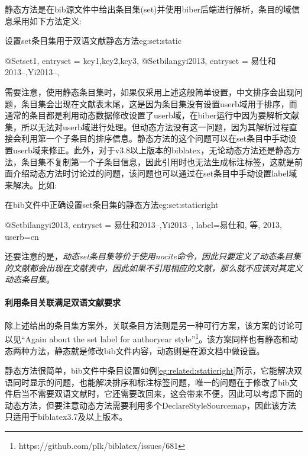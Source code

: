 静态方法是在bib源文件中给出条目集(set)并使用biber后端进行解析，条目的域信息采用如下方法定义:
\begin{example}{设置set条目集用于双语文献静态方法}{eg:set:static}
\begin{texlist}
@Set{set1,
entryset = {key1,key2,key3},
}
@Set{bilangyi2013,
entryset = {易仕和2013--,Yi2013--},
}
\end{texlist}
\end{example}

需要注意，使用静态条目集时，如果仅采用上述这般简单设置，中文排序会出现问题，条目集会出现在文献表末尾，这是因为条目集没有设置userb域用于排序，而通常的条目都是利用动态数据修改设置了userb域，在biber运行中因为要解析文献集，所以无法对userb域进行处理。但动态方法没有这一问题，因为其解析过程直接会利用第一个子条目的排序信息。静态方法的这个问题可以在set条目中手动设置userb域来修正。此外，对于v3.8以上版本的biblatex，无论动态方法还是静态方法，条目集不复制第一个子条目信息，因此引用时也无法生成标注标签，这就是前面介绍动态方法时讨论过的问题，该问题也可以通过在set条目中手动设置label域来解决。比如:

\begin{example}{在bib文件中正确设置set条目集的静态方法}{eg:set:staticright}
\begin{texlist}
@Set{bilangyi2013,
entryset = {易仕和2013--,Yi2013--},
label={易仕和, 等, 2013},
userb={cn}
}
\end{texlist}
\end{example}

还要注意的是，\emph{动态set条目集等价于使用nocite命令，因此只要定义了动态条目集的文献都会出现在文献表中，因此如果不引用相应的文献，那么就不应该对其定义动态条目集}。

\paragraph{利用条目关联满足双语文献要求}

除上述给出的条目集方案外，关联条目方法则是另一种可行方案，该方案的讨论可以见“Again about the \@ set label for authoryear style”\footnote{https://github.com/plk/biblatex/issues/681}。该方案同样也有静态和动态两种方法，静态就是修改bib文件内容，动态则是在源文档中做设置。

静态方法很简单，bib文件中条目设置如例\ref{eg:related:staticright}所示，它能解决双语同时显示的问题，也能解决排序和标注标签问题，唯一的问题在于修改了bib文件后当不需要双语文献时，它还需要改回来，这会带来不便，因此可以考虑下面的动态方法，但要注意动态方法需要利用多个DeclareStyleSourcemap，因此该方法只适用于biblatex3.7及以上版本。


